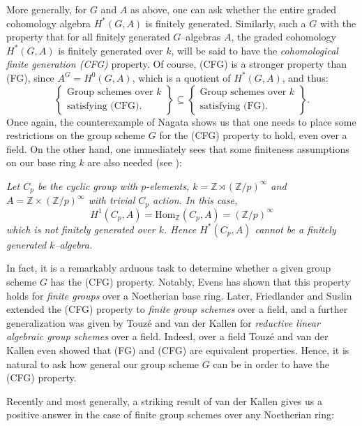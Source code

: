 \documentclass{article}
\theoremstyle{plain}
\theoremstyle{definition}
\begin{document}
More generally, for $G$ and $A$ as above, one can ask whether the entire graded cohomology algebra $H^*(G, A)$ is finitely generated. Similarly, such a $G$ with the property that for all finitely generated $G$--algebras $A$, the graded cohomology $H^*(G, A)$ is finitely generated over $k$, will be said to have the \textit{cohomological finite generation (CFG)} property. Of course, (CFG) is a stronger property than (FG), since $A^G=H^0(G,A)$, which is a quotient of $H^\ast(G,A)$, and thus: 
\[  \left\{ \begin{array}{l}
          \mbox{Group schemes over $k$}\\
         \mbox{satisfying (CFG)}.\end{array} \right\} \subseteq \left\{ \begin{array}{l}
          \mbox{Group schemes over $k$}\\
         \mbox{satisfying (FG)}.\end{array} \right\}.  \] 
Once again, the counterexample of Nagata shows us that one needs to place some restrictions on the group scheme $G$ for the (CFG) property to hold, even over a field. On the other hand, one immediately sees that some finiteness assumptions on our base ring $k$ are also needed (see \cite[Section 4.2]{BenII}):

   \textit{ Let $C_p$ be the cyclic group with $p$-elements, $k=\mathbb{Z}\rtimes (\mathbb{Z}/p)^\infty$ and $A=\mathbb{Z}\times (\mathbb{Z}/p)^\infty$ with trivial $C_p$ action. In this case,  
   \[
   H^1(C_p,A)=\mathrm{Hom}_{\mathbb{Z}}(C_p,A)=(\mathbb{Z}/p)^\infty
   \]
   which is not  finitely generated over $k$. Hence $H^\ast(C_p,A)$ cannot be a finitely generated $k$--algebra. }

In fact, it is a remarkably arduous task to determine whether a given group scheme $G$ has the (CFG) property. Notably, Evens \cite{Eve61} has shown that this property holds for \textit{finite groups} over a Noetherian base ring. Later, Friedlander and Suslin \cite{FS97} extended the (CFG) property to \textit{finite group schemes} over a field, and a further generalization was given by Touzé and van der Kallen \cite{TvdK10} for \textit{reductive linear algebraic group schemes} over a field. Indeed, over a field Touz\'e and van der Kallen even showed that (FG) and (CFG) are equivalent properties. Hence, it is natural to ask how general our group scheme $G$ can be in order to have the (CFG) property.

Recently and most generally, a striking result of van der Kallen \cite{vdK23} gives us a positive answer in the case of finite group schemes over any Noetherian ring: 
\end{document}

